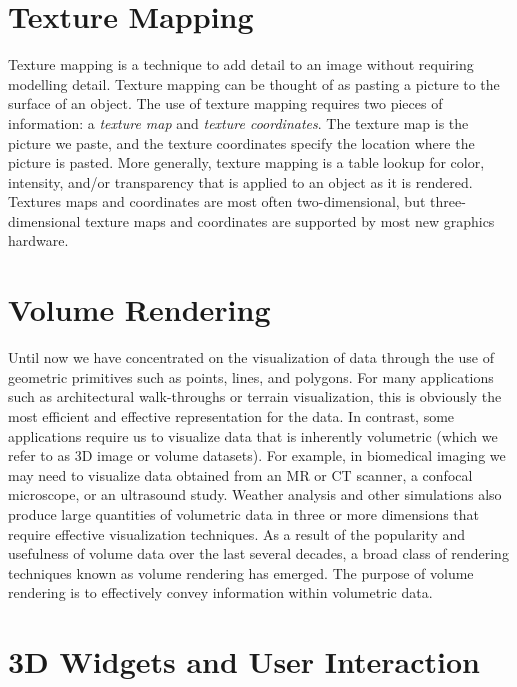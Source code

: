 \section{Texture Mapping}

Texture mapping is a technique to add detail to an image without requiring modelling detail. Texture mapping can be thought of as pasting a picture to the surface of an object. The use of texture mapping requires two pieces of information: a \emph{texture map} and \emph{texture coordinates}. The texture map is the picture we paste, and the texture coordinates specify the location where the picture is pasted. More generally, texture mapping is a table lookup for color, intensity, and/or transparency that is applied to an object as it is rendered. Textures maps and coordinates are most often two-dimensional,
but three-dimensional texture maps and coordinates are supported by most new graphics hardware.

\section{Volume Rendering}
\label{sec:volume_rendering}

Until now we have concentrated on the visualization of data through the use of geometric primitives such as points, lines, and polygons.
For many applications such as architectural walk-throughs or terrain visualization, this is obviously the most efficient and effective representation for the data.
In contrast, some applications require us to visualize data that is inherently volumetric (which we refer to as 3D image or volume datasets).
For example, in biomedical imaging we may need to visualize data obtained from an MR or CT scanner, a confocal microscope, or an ultrasound study.
Weather analysis and other simulations also produce large quantities of volumetric data in three or more dimensions that require effective visualization techniques.
As a result of the popularity and usefulness of volume data over the last several decades, a broad class of rendering techniques known as volume rendering has emerged. The purpose of volume rendering is to effectively convey information within volumetric data.

\section{3D Widgets and User Interaction}
\label{sec:3dwui}

